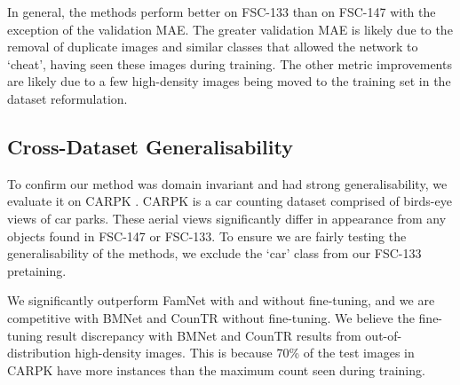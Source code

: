 \documentclass[../thesis.tex]{subfiles}
\begin{document}
In general, the methods perform better on FSC-133 than on FSC-147 with the exception of the validation MAE. The greater validation MAE is likely due to the removal of duplicate images and similar classes that allowed the network to `cheat', having seen these images during training. The other metric improvements are likely due to a few high-density images being moved to the training set in the dataset reformulation.

\begin{table}
    \centering
    
    \caption{Comparison to state-of-the-art methods on FSC-147. We outperform other exemplar-free methods and achieve competitive results with methods which use exemplar images and test-time adaptation. We highlight the best results for few-shot and zero-shot exemplar-based-training and exemplar-free-training methods. $\dag$ denotes methods trained using the same backbone as ours. 
    * indicates an exemplar-free modification of an exemplar-based method. Methods in grey were made public after this work.
    }
    \label{fig__LTCA__FSC147_results_table}
\end{table}
\begin{table}
    \centering
    
    \caption{Comparison to available state-of-the-art methods on FSC-133.  We are competitive with exemplar-based methods without  exemplar images or test-time adaptation.
    $\dag$ denotes methods trained using the same backbone as ours.
    Methods in grey were made public after this work.
    }
    \label{fig__LTCA__FSC133_results_table}
\end{table}
 \subsection{Cross-Dataset Generalisability}
To confirm our method was domain invariant and had strong generalisability, we evaluate it on CARPK \cite{hsieh2017drone}. CARPK is a car counting dataset comprised of birds-eye views of car parks. These aerial views significantly differ in appearance from any objects found in FSC-147 or FSC-133. To ensure we are fairly testing the generalisability of the methods, we exclude the `car' class from our FSC-133 pretaining. 

We significantly outperform FamNet with and without fine-tuning, and we are competitive with BMNet and CounTR without fine-tuning. We believe the fine-tuning result discrepancy with BMNet and CounTR results from
 out-of-distribution high-density images.
This is because 70\% of the test images in CARPK have more instances than the maximum count seen during training.
\end{document}
